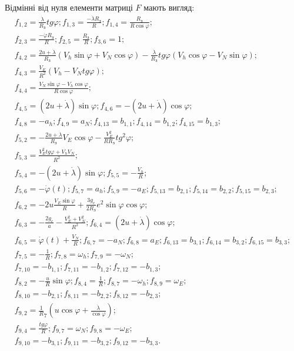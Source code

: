 Відмінні від нуля елементи матриці $F$ мають вигляд:
\begin{equation}
\label{eq:Fsdins_} 
\begin{array}{l}
{f_{1,2} =\frac{\dot{\lambda }}{R_{\text{З}} } tg\varphi;f_{1,3} =\frac{-\dot{\lambda }R_{\text{З}} }{R};f_{1,4} =\frac{R_{\text{З}} }{R\cos \varphi } ;}\\
{f_{2,3} =\frac{-\dot{\varphi }R_{\text{З}} }{R};f_{2,5} =\frac{R_{\text{З}} }{R};f_{3,6} =1;}\\
{f_{4,2} =\frac{2u+\dot{\lambda }}{R_{\text{З}} } \left(V_{h} \sin \varphi +V_{N} \cos \varphi \right)-\frac{\dot{\lambda }}{R_{\text{З}} } tg\varphi \left(V_{h} \cos \varphi -V_{N} \sin \varphi \right);}\\
{f_{4,3}=\frac{V_{E} }{R^{2} } \left(V_{h} -V_{N} tg\varphi \right);}\\
{f_{4,4}=\frac{V_{N}\sin \varphi -V_{h} \cos \varphi }{R\cos \varphi } ;}\\
{f_{4,5}=\left(2u+\dot{\lambda }\right)\sin \varphi; f_{4,6}=-\left(2u+\dot{\lambda }\right)\cos \varphi ;}\\
{f_{4,8}=-a_{h};f_{4,9}=a_{N};f_{4,13}=b_{1,1};f_{4,14}=b_{1,2};f_{4,15}=b_{1,3};}\\
{f_{5,2}=-\frac{2u+\dot{\lambda }}{R_{\text{З}} }V_{E} \cos \varphi -\frac{V_{E}^{2} }{RR_{\text{З}} } tg^{2} \varphi ;}\\
{f_{5,3}=\frac{V_{E}^{2} tg\varphi +V_{h} V_{N} }{R^{2} } ;}\\ 
{f_{5,4}=-\left(2u+\dot{\lambda }\right)\sin \varphi;f_{5,5}=-\frac{V_{h} }{R};}\\
{f_{5,6}=-\dot{\varphi }(t);f_{5,7}=a_{h}; f_{5,9} =-a_{E};f_{5,13}=b_{2,1};f_{5,14}=b_{2,2};f_{5,15}=b_{2,3} ;}\\
{f_{6,2} =-2u\frac{V_{E}^{} \sin \varphi }{R} +\frac{3g_{e} }{2R_{\text{З}}} e^{2} \sin \varphi \cos \varphi ;}\\
{f_{6,3} =-\frac{2g_{e} }{a} -\frac{V_{E}^{2} +V_{N}^{2}}{R^{2} };f_{6,4} =\left(2u+\dot{\lambda }\right)\cos \varphi ;}\\
{f_{6,5}=\dot{\varphi }(t)+\frac{V_{N} }{R};f_{6,7} =-a_{N} ;f_{6,8} =a_{E} ;f_{6,13}=b_{3,1};f_{6,14}=b_{3,2}; f_{6,15}=b_{3,3} ;}\\ 
{f_{7,5}=-\frac{1}{R} ;f_{7,8}=\omega_{h}; f_{7,9}=-\omega_{N} ;}\\
{f_{7,10}=-b_{1,1};f_{7,11}=-b_{1,2};f_{7,12}=-b_{1,3} ;}\\ 
{f_{8,2} =-\frac{u}{R} \sin \varphi; f_{8,4} =\frac{1}{R};f_{8,7} =-\omega_{h};f_{8,9} =\omega_{E};}\\
{f_{8,10} =-b_{2,1}; f_{8,11} =-b_{2,2}; f_{8,12} =-b_{2,3} ;}\\ 
{f_{9,2} =\frac{1}{R}_{7} (u\cos \varphi +\frac{\dot{\lambda }}{\cos \varphi });}\\
{f_{9,4} =\frac{tg\varphi }{R}; f_{9,7} =\omega_{N}; f_{9,8} =-\omega_{E};}\\ 
{f_{9,10} =-b_{3,1};f_{9,11} =-b_{3,2};f_{9,12} =-b_{3,3}.}
\end{array}
\end{equation} 
